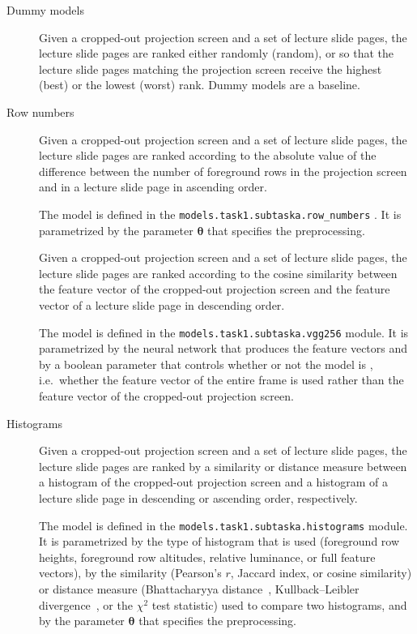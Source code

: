 \begin{description}
  \item[Dummy models]
    Given a cropped-out projection screen and a set of lecture slide pages, the
    lecture slide pages are ranked either randomly (random), or so that the
    lecture slide pages matching the projection screen receive the highest
    (best) or the lowest (worst) rank. Dummy models are a baseline.

  \item[Row numbers]
    Given a cropped-out projection screen and a set of lecture slide
    pages, the lecture slide pages are ranked according to the absolute value of
    the difference between the number of foreground rows in the projection
    screen and in a lecture slide page in ascending order.

    The model is defined in the
    \texttt{models.task1.subtaska.row\_numbers} .
    It is parametrized by the parameter $\bm\theta$ that specifies the
    preprocessing.

  \item[]
    Given a cropped-out projection screen and a set of lecture slide
    pages, the lecture slide pages are ranked according to the cosine
    similarity between the  feature vector of the cropped-out
    projection screen and the  feature vector of a lecture slide page
    in descending order.
    
    The model is defined in the
    \texttt{models.task1.subtaska.vgg256} module. It is parametrized by
    the neural network that produces the  feature vectors and by a
    boolean parameter that controls whether or not the model is
    , i.e.\ whether the  feature vector of the
    entire frame is used rather than the  feature vector of the
    cropped-out projection screen.

  \item[Histograms]
    Given a cropped-out projection screen and a set of lecture slide
    pages, the lecture slide pages are ranked by a similarity or distance
    measure between a histogram of the cropped-out projection screen and a
    histogram of a lecture slide page in descending or ascending order,
    respectively.

    The model is defined in the
    \texttt{models.task1.subtaska.histograms} module. It is parametrized by
    the type of histogram that is used (foreground row heights, foreground row
    altitudes, relative luminance, or full feature vectors), by the similarity
    (Pearson's $r$, Jaccard index, or cosine similarity) or distance measure
    (Bhattacharyya distance~\cite{bhattacharyya1943measure}, Kullback--Leibler
    divergence~\cite{kullback1951information}, or the $\chi^2$ test statistic)
    used to compare two histograms, and by the parameter $\bm\theta$ that
    specifies the preprocessing.


\end{description}
